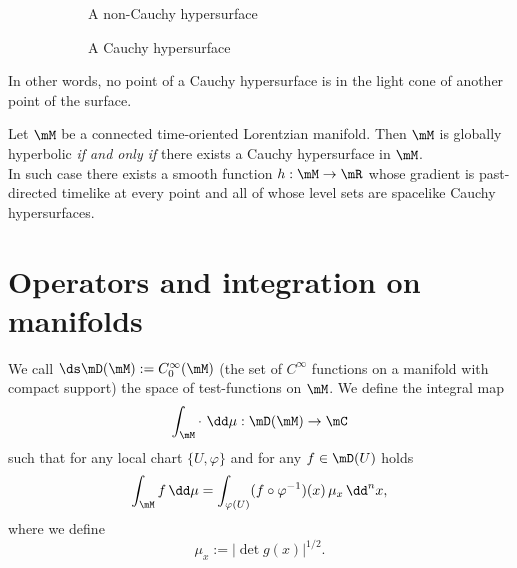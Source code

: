\begin{figure}
	\begin{subfigure}{.5\textwidth}
	\caption{A non-Cauchy hypersurface}
\end{subfigure}
\begin{subfigure}{.5\textwidth}
	\caption{A Cauchy hypersurface}
\end{subfigure}
\caption{}
\end{figure}


In other words, no point of a Cauchy hypersurface is in the light cone of another point of the surface.
\begin{theorem}
	Let $\mM$ be a connected time-oriented Lorentzian manifold. Then $\mM$ is globally hyperbolic \emph{if and only if} there exists a Cauchy hypersurface in $\mM$.\\
	In such case there exists a smooth function $h:\mM\to\mR$ whose gradient is past-directed timelike at every point and all of whose level sets are spacelike Cauchy hypersurfaces.
\end{theorem}


\section{Operators and integration on manifolds}
We call $\ds\mD(\mM):= C_0^\infty(\mM)$ (the set of $C^\infty$ functions on a manifold with compact support) the space of test-functions on $\mM$. We define the integral map
\[	\int_{\mM}\cdot\ \dd\mu:\mD(\mM)\to \mC	\]
such that for any local chart $\{U,\varphi\}$ and for any $f\in\mD(U)$ holds
\[	\int_{\mM}f\,\dd\mu=\int_{\varphi(U)}(f\circ\varphi^{-1})(x)\,\mu_x\,\dd^nx,		\]
where we define \begin{equation}
	\mu_x:=|\det g(x)|^{1/2}.
\end{equation}

